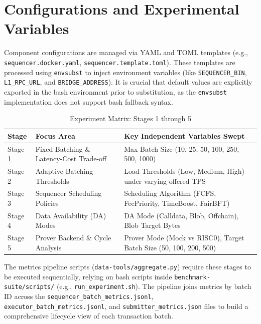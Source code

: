 \section{Configurations and Experimental Variables}
\label{sec:configurations}
Component configurations are managed via YAML and TOML templates (e.g., \texttt{sequencer.docker.yaml}, \texttt{sequencer.template.toml}). These templates are processed using \texttt{envsubst} to inject environment variables (like \texttt{SEQUENCER\_BIN}, \texttt{L1\_RPC\_URL}, and \texttt{BRIDGE\_ADDRESS}). It is crucial that default values are explicitly exported in the bash environment prior to substitution, as the \texttt{envsubst} implementation does not support bash fallback syntax.

\begin{table}[H]
\centering
\caption{Experiment Matrix: Stages 1 through 5}
\label{tab:experiment_matrix}
\small
\begin{tabularx}{\textwidth}{>{\hsize=0.5\hsize}X >{\hsize=1.2\hsize}X >{\hsize=1.3\hsize}X}
\toprule
\textbf{Stage} & \textbf{Focus Area} & \textbf{Key Independent Variables Swept} \\
\midrule
Stage 1 & Fixed Batching \& Latency-Cost Trade-off & Max Batch Size (10, 25, 50, 100, 250, 500, 1000) \\
\addlinespace
Stage 2 & Adaptive Batching Thresholds & Load Thresholds (Low, Medium, High) under varying offered TPS \\
\addlinespace
Stage 3 & Sequencer Scheduling Policies & Scheduling Algorithm (FCFS, FeePriority, TimeBoost, FairBFT) \\
\addlinespace
Stage 4 & Data Availability (DA) Modes & DA Mode (Calldata, Blob, Offchain), Blob Target Bytes \\
\addlinespace
Stage 5 & Prover Backend \& Cycle Analysis & Prover Mode (Mock vs RISC0), Target Batch Size (50, 100, 200, 500) \\
\bottomrule
\end{tabularx}
\end{table}

The metrics pipeline scripts (\texttt{data-tools/aggregate.py}) require these stages to be executed sequentially, relying on bash scripts inside \texttt{benchmark-suite/scripts/} (e.g., \texttt{run\_experiment.sh}). The pipeline joins metrics by batch ID across the \texttt{sequencer\_batch\_metrics.jsonl}, \texttt{executor\_batch\_metrics.jsonl}, and \texttt{submitter\_metrics.json} files to build a comprehensive lifecycle view of each transaction batch.
